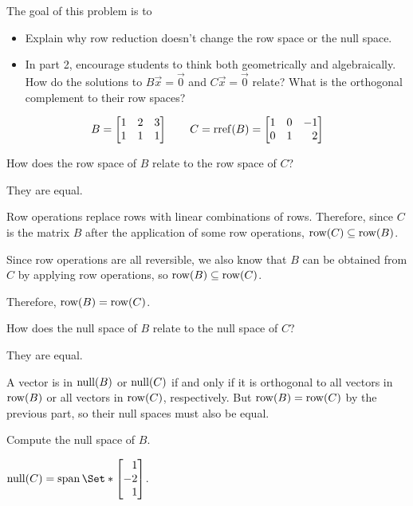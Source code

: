 \documentclass{workbook}
\newcommand{\bookonlynewpage}{\begin{bookonly}\newpage\end{bookonly}}
\begin{document}
\begin{slide}
	\bookonlynewpage
	\question
	\begin{annotation}
		\begin{goals}

			The goal of this problem is to
			\begin{itemize}
				\item Explain why row reduction doesn't change the row space or the null space.
			\end{itemize}
		\end{goals}

		\begin{notes}
			\begin{itemize}
				\item In part 2, encourage students to think both geometrically
					and algebraically. How do the solutions to $B\vec x=\vec 0$ and
					$C\vec x=\vec 0$ relate? What is the orthogonal complement to their row
					spaces?
			\end{itemize}
		\end{notes}
	\end{annotation}
	\[
		B=\mat{1&2&3\\1&1&1}\qquad C=\rref(B)=\mat{1&0&-1\\0&1&2}
	\]
	\begin{parts}
		\item How does the row space of $B$ relate to the row space of $C$?
			\begin{solution}
				They are equal.

				Row operations replace rows with linear combinations of rows.
				Therefore, since $C$ is the matrix $B$ after the application of
				some row operations, $\operatorname{row}(C)\subseteq\operatorname{row}(B)$.

				Since row operations are all reversible, we also know that $B$
				can be obtained from $C$ by applying row operations, so
				$\operatorname{row}(B)\subseteq\operatorname{row}(C)$.

				Therefore, $\operatorname{row}(B)=\operatorname{row}(C)$.
			\end{solution}
		\item How does the null space of $B$ relate to the null space of $C$?
			\begin{solution}
				They are equal.

				A vector is in $\operatorname{null}(B)$ or $\operatorname{null}(C)$ if and only if it is
				orthogonal to all vectors in $\operatorname{row}(B)$ or all vectors in $\operatorname{row}(C)$,
				respectively. But $\operatorname{row}(B)=\operatorname{row}(C)$ by the previous part, so
				their null spaces must also be equal.
			\end{solution}
		\item Compute the null space of $B$.
			\begin{solution}
				$\Null(C)=\Span\Set*{\mat{1\\-2\\1}}$.


\end{solution}
\end{parts}
\end{slide}
\end{document}
